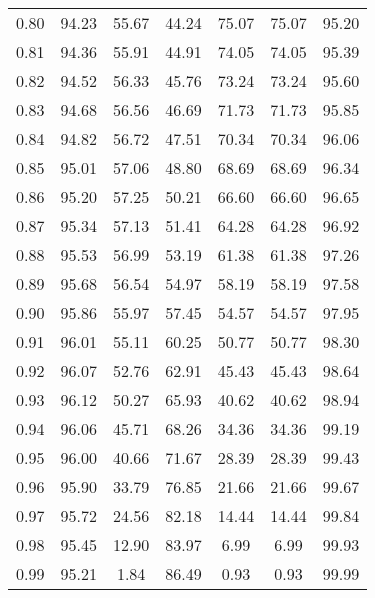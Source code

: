 \begin{tabular}{|c|c|c|c|c|c|c|}
      0.80 &     94.23 &     55.67 &      44.24 &   75.07 &      75.07 &         95.20 \\
      0.81 &     94.36 &     55.91 &      44.91 &   74.05 &      74.05 &         95.39 \\
      0.82 &     94.52 &     56.33 &      45.76 &   73.24 &      73.24 &         95.60 \\
      0.83 &     94.68 &     56.56 &      46.69 &   71.73 &      71.73 &         95.85 \\
      0.84 &     94.82 &     56.72 &      47.51 &   70.34 &      70.34 &         96.06 \\
      0.85 &     95.01 &     57.06 &      48.80 &   68.69 &      68.69 &         96.34 \\
      0.86 &     95.20 &     57.25 &      50.21 &   66.60 &      66.60 &         96.65 \\
      0.87 &     95.34 &     57.13 &      51.41 &   64.28 &      64.28 &         96.92 \\
      0.88 &     95.53 &     56.99 &      53.19 &   61.38 &      61.38 &         97.26 \\
      0.89 &     95.68 &     56.54 &      54.97 &   58.19 &      58.19 &         97.58 \\
      0.90 &     95.86 &     55.97 &      57.45 &   54.57 &      54.57 &         97.95 \\
      0.91 &     96.01 &     55.11 &      60.25 &   50.77 &      50.77 &         98.30 \\
      0.92 &     96.07 &     52.76 &      62.91 &   45.43 &      45.43 &         98.64 \\
      0.93 &     96.12 &     50.27 &      65.93 &   40.62 &      40.62 &         98.94 \\
      0.94 &     96.06 &     45.71 &      68.26 &   34.36 &      34.36 &         99.19 \\
      0.95 &     96.00 &     40.66 &      71.67 &   28.39 &      28.39 &         99.43 \\
      0.96 &     95.90 &     33.79 &      76.85 &   21.66 &      21.66 &         99.67 \\
      0.97 &     95.72 &     24.56 &      82.18 &   14.44 &      14.44 &         99.84 \\
      0.98 &     95.45 &     12.90 &      83.97 &    6.99 &       6.99 &         99.93 \\
      0.99 &     95.21 &      1.84 &      86.49 &    0.93 &       0.93 &         99.99 \\
\bottomrule
\end{tabular}
